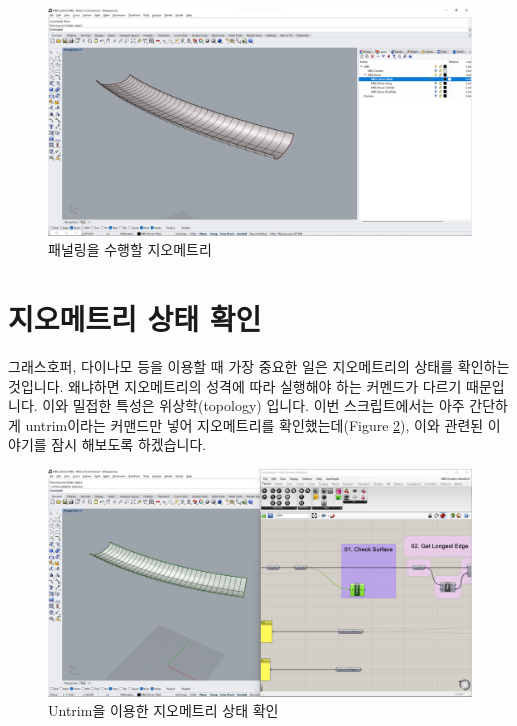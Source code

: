 \documentclass[11pt]{article}
\begin{document}
\begin{figure}[H]
    \includegraphics*[width=\textwidth]{./img/mbs_layer_main.png}
    \caption{패널링을 수행할 지오메트리}
    \label{fig:mbs_layer_main}
\end{figure}
\pagebreak
\section{지오메트리 상태 확인}
그래스호퍼, 다이나모 등을 이용할 때 가장 중요한 일은 지오메트리의 상태를 확인하는 것입니다. 왜냐하면 지오메트리의 성격에 따라 실행해야 하는 커멘드가 다르기 때문입니다. 이와 밀접한 특성은 위상학(topology) 입니다.
이번 스크립트에서는 아주 간단하게 untrim이라는 커맨드만 넣어 지오메트리를 확인했는데(Figure \ref{fig:mbs_01_check}), 이와 관련된 이야기를 잠시 해보도록 하겠습니다.

\begin{figure}[H]
    \includegraphics[width=\textwidth]{./img/mbs_01_check.png}
    \caption{Untrim을 이용한 지오메트리 상태 확인}
    \label{fig:mbs_01_check}
\end{figure}
\end{document}
